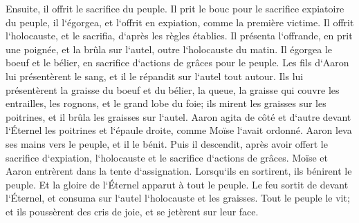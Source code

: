 \verse Ensuite, il offrit le sacrifice du peuple. Il prit le bouc pour le sacrifice expiatoire du peuple, il l`égorgea, et l`offrit en expiation, comme la première victime. 
\verse Il offrit l`holocauste, et le sacrifia, d`après les règles établies. 
\verse Il présenta l`offrande, en prit une poignée, et la brûla sur l`autel, outre l`holocauste du matin. 
\verse Il égorgea le boeuf et le bélier, en sacrifice d`actions de grâces pour le peuple. Les fils d`Aaron lui présentèrent le sang, et il le répandit sur l`autel tout autour. 
\verse Ils lui présentèrent la graisse du boeuf et du bélier, la queue, la graisse qui couvre les entrailles, les rognons, et le grand lobe du foie; 
\verse ils mirent les graisses sur les poitrines, et il brûla les graisses sur l`autel. 
\verse Aaron agita de côté et d`autre devant l`Éternel les poitrines et l`épaule droite, comme Moïse l`avait ordonné. 
\verse Aaron leva ses mains vers le peuple, et il le bénit. Puis il descendit, après avoir offert le sacrifice d`expiation, l`holocauste et le sacrifice d`actions de grâces. 
\verse Moïse et Aaron entrèrent dans la tente d`assignation. Lorsqu`ils en sortirent, ils bénirent le peuple. Et la gloire de l`Éternel apparut à tout le peuple. 
\verse Le feu sortit de devant l`Éternel, et consuma sur l`autel l`holocauste et les graisses. Tout le peuple le vit; et ils poussèrent des cris de joie, et se jetèrent sur leur face. 

